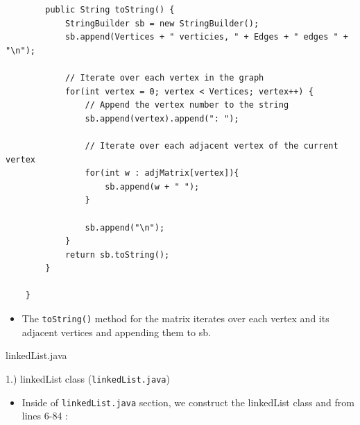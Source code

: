\documentclass{article}
\begin{document}
\begin{verbatim}
        public String toString() {
            StringBuilder sb = new StringBuilder();
            sb.append(Vertices + " verticies, " + Edges + " edges " + "\n");
            
            // Iterate over each vertex in the graph
            for(int vertex = 0; vertex < Vertices; vertex++) {
                // Append the vertex number to the string
                sb.append(vertex).append(": ");
    
                // Iterate over each adjacent vertex of the current vertex
                for(int w : adjMatrix[vertex]){
                    sb.append(w + " ");
                }
                
                sb.append("\n");
            }
            return sb.toString();
        }
    
    }
\end{verbatim}

\begin{itemize}

\item The \verb|toString()| method for the matrix iterates over each vertex and its adjacent vertices and appending them to sb.\\

\end{itemize}

\pagebreak

\begin{center}
\begin{large}
    linkedList.java
\end{large}
\end{center}


\begin{large}
    1.) linkedList class (\verb|linkedList.java|)
\end{large}

\begin{itemize}
\item Inside of \verb|linkedList.java| section, we construct the linkedList class and from lines 6-84 :
\end{itemize}
\end{document}
